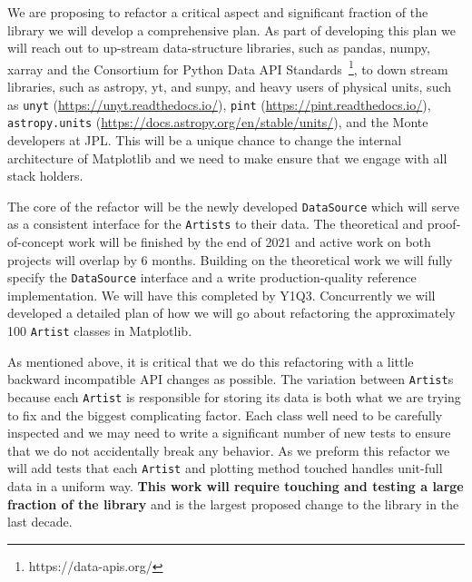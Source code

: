 \documentclass[12pt]{article}
\numberwithin{page}{section}
\begin{document}


We are proposing to refactor a critical aspect and significant
fraction of the library we will develop a comprehensive plan.  As part
of developing this plan we will reach out to up-stream data-structure
libraries, such as pandas, numpy, xarray and the Consortium for Python
Data API Standards~\footnote{https://data-apis.org/}, to down stream
libraries, such as astropy, yt, and sunpy, and heavy users of physical
units, such as \texttt{unyt} (\url{https://unyt.readthedocs.io/}),
\texttt{pint} (\url{https://pint.readthedocs.io/}),
\texttt{astropy.units}
(\url{https://docs.astropy.org/en/stable/units/}), and the Monte
developers at JPL.  This will be a unique chance to change the
internal architecture of Matplotlib and we need to make ensure that we
engage with all stack holders.

The core of the refactor will be the newly developed
\texttt{DataSource} which will serve as a consistent interface for the
\texttt{Artists} to their data.  The theoretical and proof-of-concept
work will be finished by the end of 2021 and active work on both
projects will overlap by 6 months.  Building on the theoretical work
we will fully specify the \texttt{DataSource} interface and a write
production-quality reference implementation.  We will have this
completed by Y1Q3.  Concurrently we will developed a detailed plan of
how we will go about refactoring the approximately 100 \texttt{Artist}
classes in Matplotlib.

As mentioned above, it is critical that we do this refactoring with a
little backward incompatible API changes as possible.  The variation
between \texttt{Artist}s because each \texttt{Artist} is responsible
for storing its data is both what we are trying to fix and the biggest
complicating factor.  Each class well need to be carefully inspected
and we may need to write a significant number of new tests to ensure
that we do not accidentally break any behavior.  As we preform this
refactor we will add tests that each \texttt{Artist} and plotting
method touched handles unit-full data in a uniform way.  \textbf{This
  work will require touching and testing a large fraction of the
  library} and is the largest proposed change to the library in the
last decade.
\end{document}
